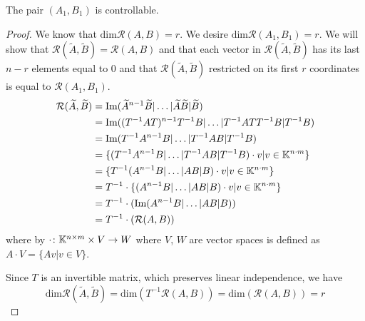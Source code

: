 \begin{lemma}
	The pair $(A_1,B_1)$ is controllable.
\end{lemma}

\begin{proof}
	We know that $\text{dim}\mathcal{R}(A,B)=r$. We desire $\text{dim}\mathcal{R}(A_1,B_1)=r$. We will show that $\mathcal{R}(\widetilde{A},\widetilde{B})=\mathcal{R}(A,B)$ and that each vector in $\mathcal{R}(\widetilde{A},\widetilde{B})$ has its last $n-r$ elements equal to 0 and that $\mathcal{R}(\widetilde{A},\widetilde{B})$ restricted on its first $r$ coordinates is equal to $\mathcal{R}(A_1,B_1)$. 
	\begin{align*}
		\mathcal{R}(\widetilde{A},\widetilde{B})&=\text{Im}(\widetilde{A}^{n-1}\widetilde{B}|\ldots|\widetilde{A}\widetilde{B}|\widetilde{B}) \\
		&=\text{Im}((T^{-1}AT)^{n-1}T^{-1}B|\ldots|T^{-1}ATT^{-1}B|T^{-1}B) \\
		&=\text{Im}(T^{-1}A^{n-1}B|\ldots|T^{-1}AB|T^{-1}B) \\
		&=\{(T^{-1}A^{n-1}B|\ldots|T^{-1}AB|T^{-1}B)\cdot v | v \in \mathbb{K}^{n\cdot m}\} \\
		&=\{T^{-1}(A^{n-1}B|\ldots|AB|B)\cdot v | v \in \mathbb{K}^{n\cdot m}\} \\
		&=T^{-1}\cdot\{(A^{n-1}B|\ldots|AB|B)\cdot v | v \in \mathbb{K}^{n\cdot m}\} \\
		&=T^{-1}\cdot(\text{Im}(A^{n-1}B|\ldots|AB|B)) \\
		&=T^{-1}\cdot(\mathcal{R}(A,B))
	\end{align*}
	where by $\cdot\colon\mathbb{K}^{n\times m}\times V\rightarrow W$ where $V$, $W$ are vector spaces is defined as $A\cdot V=\{Av|v\in V\}$.

	Since $T$ is an invertible matrix, which preserves linear independence, we have $$\text{dim}\mathcal{R}(\widetilde{A},\widetilde{B})=\text{dim}(T^{-1}\mathcal{R}(A,B))=\text{dim}(\mathcal{R}(A,B))=r$$


\end{proof}
